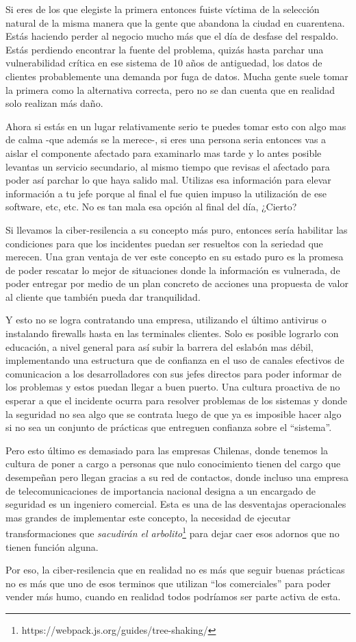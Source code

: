 \documentclass[11pt]{utalcaDoc}
\begin{document}
Si eres de los que elegiste la primera entonces fuiste víctima de la selección natural de la misma manera que la gente que abandona la ciudad en cuarentena. Estás haciendo perder al negocio mucho más que el día de desfase del respaldo. Estás perdiendo encontrar la fuente del problema, quizás hasta parchar una vulnerabilidad crítica en ese sistema de 10 años de antiguedad, los datos de clientes probablemente una demanda por fuga de datos. Mucha gente suele tomar la primera como la alternativa correcta, pero no se dan cuenta que en realidad solo realizan más daño.

Ahora si estás en un lugar relativamente serio te puedes tomar esto con algo mas de calma -que además se la merece-, si eres una persona seria entonces vas a aislar el componente afectado para examinarlo mas tarde y lo antes posible levantas un servicio secundario, al mismo tiempo que revisas el afectado para poder así parchar lo que haya salido mal. Utilizas esa información para elevar información a tu jefe porque al final el fue quien impuso la utilización de ese software, etc, etc. No es tan mala esa opción al final del día, ¿Cierto?

Si llevamos la ciber-resilencia a su concepto más puro, entonces sería habilitar las condiciones para que los incidentes puedan ser resueltos con la seriedad que merecen. Una gran ventaja de ver este concepto en su estado puro es la promesa de poder rescatar lo mejor de situaciones donde la información es vulnerada, de poder entregar por medio de un plan concreto de acciones una propuesta de valor al cliente que también pueda dar tranquilidad.

Y esto no se logra contratando una empresa, utilizando el último antivirus o instalando firewalls hasta en las terminales clientes. Solo es posible lograrlo con educación, a nivel general para así subir la barrera del eslabón mas débil, implementando una estructura que de confianza en el uso de canales efectivos de comunicacion a los desarrolladores con sus jefes directos para poder informar de los problemas y estos puedan llegar a buen puerto. Una cultura proactiva de no esperar a que el incidente ocurra para resolver problemas de los sistemas y donde la seguridad no sea algo que se contrata luego de que ya es imposible hacer algo si no sea un conjunto de prácticas que entreguen confianza sobre el ``sistema''.

Pero esto último es demasiado para las empresas Chilenas, donde tenemos la cultura de poner a cargo a personas que nulo conocimiento tienen del cargo que desempeñan pero llegan gracias a su red de contactos, donde incluso una empresa de telecomunicaciones de importancia nacional designa a un encargado de seguridad es un ingeniero comercial. Esta es una de las desventajas operacionales mas grandes de implementar este concepto, la necesidad de ejecutar transformaciones que \textit{sacudirán el arbolito}\footnote{https://webpack.js.org/guides/tree-shaking/} para dejar caer esos adornos que no tienen función alguna.

Por eso, la ciber-resilencia que en realidad no es más que seguir buenas prácticas no es más que uno de esos terminos que utilizan ``los comerciales'' para poder vender más humo, cuando en realidad todos podríamos ser parte activa de esta.
\end{document}

